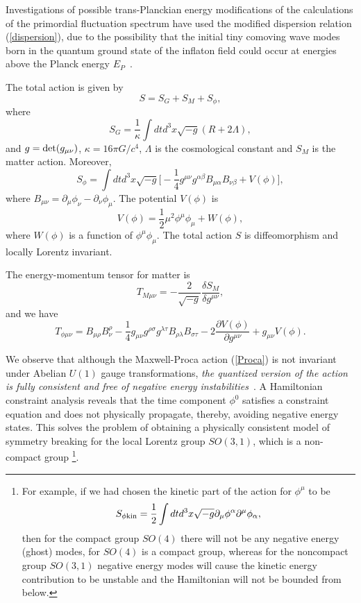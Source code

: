 \documentclass[a4paper,12pt]{article}
\begin{document}
Investigations of possible trans-Planckian energy modifications of the calculations
of the primordial fluctuation spectrum have used the modified dispersion relation
(\ref{dispersion}), due to the possibility that the initial tiny comoving wave modes
born in the quantum ground state of the inflaton field could occur at energies above
the Planck energy $E_P$~\cite{Brandenberger}.

The total action is given by
\begin{equation}
S=S_G+S_M+S_\phi,
\end{equation}
where
\begin{equation}
\label{grav}
S_G=\frac{1}{\kappa}\int dtd^3x\sqrt{-g}(R+2\Lambda),
\end{equation}
and $g={\rm det}(g_{\mu\nu})$, $\kappa=16\pi G/c^4$, $\Lambda$ is the
cosmological constant and $S_M$ is the matter action. Moreover,
\begin{equation}
\label{Proca}
S_\phi=\int
dtd^3x\sqrt{-g}\biggl[-\frac{1}{4}g^{\mu\nu}g^{\alpha\beta}B_{\mu\alpha}B_{\nu\beta}
+V(\phi)\biggr],
\end{equation}
where $B_{\mu\nu}=\partial_\mu\phi_\nu-\partial_\nu\phi_\mu$. The potential $V(\phi)$ is
\begin{equation}
V(\phi)=\frac{1}{2}\mu^2\phi^\mu\phi_\mu+W(\phi),
\end{equation}
where $W(\phi)$ is a function of $\phi^\mu\phi_\mu$. The total action $S$ is
diffeomorphism and locally Lorentz invariant.

The energy-momentum tensor for matter is
\begin{equation}
T_{M\mu\nu}=-\frac{2}{\sqrt{-g}}\frac{\delta S_M}{\delta
g^{\mu\nu}},
\end{equation}
and we have
\begin{equation}
T_{\phi\mu\nu}=B_{\mu\rho}B^\rho_\nu-\frac{1}{4}g_{\mu\nu}g^{\rho\sigma}
g^{\lambda\tau}B_{\rho\lambda}B_{\sigma\tau}-2\frac{\partial V(\phi)}
{\partial g^{\mu\nu}}+g_{\mu\nu}V(\phi).
\end{equation}

We observe that although the Maxwell-Proca action (\ref{Proca})
is not invariant under Abelian $U(1)$ gauge transformations,
{\it the quantized version of the action is fully consistent and
free of negative energy instabilities}~\cite{Isenberg}. A Hamiltonian
constraint analysis reveals that
the time component $\phi^0$ satisfies a constraint equation
and does not physically propagate, thereby, avoiding negative energy states. This
solves the problem of obtaining a physically consistent model of symmetry breaking
for the local Lorentz group $SO(3,1)$, which is a non-compact group \footnote{For
example, if we had chosen the kinetic part of the action for $\phi^\mu$ to be
\begin{equation}
S_{\phi{\rm kin}}=\frac{1}{2}\int
dtd^3x\sqrt{-g}\partial_\mu\phi^\alpha\partial^\mu\phi_\alpha,
\end{equation}
then for the compact group $SO(4)$ there will not be any negative
energy (ghost) modes, for $SO(4)$ is a compact group, whereas
for the noncompact group $SO(3,1)$ negative energy modes will cause the kinetic
energy contribution to be unstable and the Hamiltonian will not be bounded from
below.}.
\end{document}
